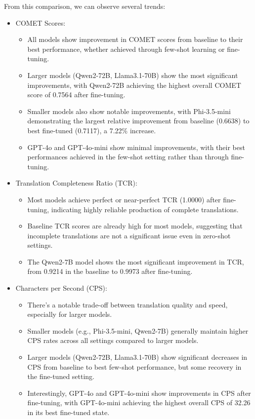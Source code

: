 \documentclass[conference]{IEEEtran}
\begin{document}
From this comparison, we can observe several trends:

\begin{itemize}
    \item COMET Scores:
    \begin{itemize}
        \item All models show improvement in COMET scores from baseline to their best performance, whether achieved through few-shot learning or fine-tuning.
        \item Larger models (Qwen2-72B, Llama3.1-70B) show the most significant improvements, with Qwen2-72B achieving the highest overall COMET score of 0.7564 after fine-tuning.
        \item Smaller models also show notable improvements, with Phi-3.5-mini demonstrating the largest relative improvement from baseline (0.6638) to best fine-tuned (0.7117), a 7.22\% increase.
        \item GPT-4o and GPT-4o-mini show minimal improvements, with their best performances achieved in the few-shot setting rather than through fine-tuning.
    \end{itemize}

    \item Translation Completeness Ratio (TCR):
    \begin{itemize}
        \item Most models achieve perfect or near-perfect TCR (1.0000) after fine-tuning, indicating highly reliable production of complete translations.
        \item Baseline TCR scores are already high for most models, suggesting that incomplete translations are not a significant issue even in zero-shot settings.
        \item The Qwen2-7B model shows the most significant improvement in TCR, from 0.9214 in the baseline to 0.9973 after fine-tuning.
    \end{itemize}

    \item Characters per Second (CPS):
    \begin{itemize}
        \item There's a notable trade-off between translation quality and speed, especially for larger models.
        \item Smaller models (e.g., Phi-3.5-mini, Qwen2-7B) generally maintain higher CPS rates across all settings compared to larger models.
        \item Larger models (Qwen2-72B, Llama3.1-70B) show significant decreases in CPS from baseline to best few-shot performance, but some recovery in the fine-tuned setting.
        \item Interestingly, GPT-4o and GPT-4o-mini show improvements in CPS after fine-tuning, with GPT-4o-mini achieving the highest overall CPS of 32.26 in its best fine-tuned state.
    \end{itemize}


\end{itemize}
\end{document}
